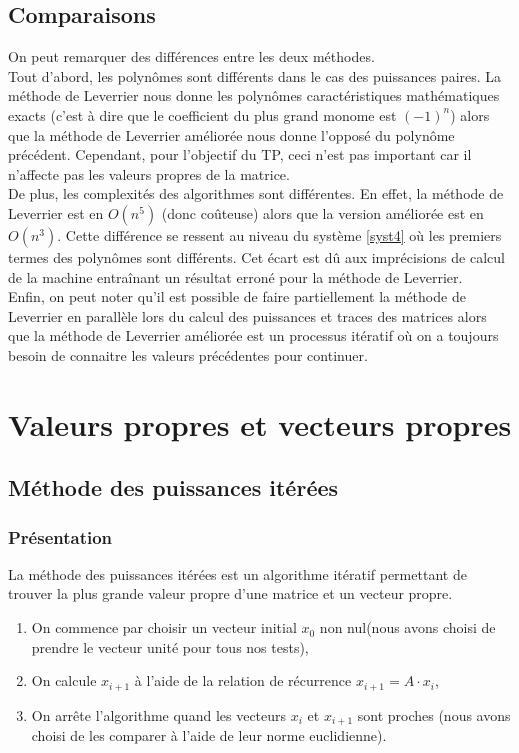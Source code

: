 \documentclass{report}
\begin{document}
    \section{Comparaisons}
    On peut remarquer des différences entre les deux méthodes. \\
    
    Tout d'abord, les polynômes sont différents dans le cas des puissances paires. La méthode de Leverrier nous donne les polynômes caractéristiques mathématiques exacts (c'est à dire que le coefficient du plus grand monome est $(-1)^{n}$) alors que la méthode de Leverrier améliorée nous donne l'opposé du polynôme précédent. Cependant, pour l'objectif du TP, ceci n'est pas important car il n'affecte pas les valeurs propres de la matrice. \\
    
    De plus, les complexités des algorithmes sont différentes. En effet, la méthode de Leverrier est en $O(n^5)$ (donc coûteuse) alors que la version améliorée est en $O(n^3)$. Cette différence se ressent au niveau du système \eqref{syst4} où les premiers termes des polynômes sont différents. Cet écart est dû aux imprécisions de calcul de la machine entraînant un résultat erroné pour la méthode de Leverrier. \\
    
    Enfin, on peut noter qu'il est possible de faire partiellement la méthode de Leverrier en parallèle lors du calcul des puissances et traces des matrices alors que la méthode de Leverrier améliorée est un processus itératif où on a toujours besoin de connaitre les valeurs précédentes pour continuer.
    
    \chapter{Valeurs propres et vecteurs propres}
    \section{Méthode des puissances itérées}
      \subsection{Présentation}
      La méthode des puissances itérées est un algorithme itératif permettant de trouver la plus grande valeur propre d'une matrice et un vecteur propre. \\
      
      \begin{enumerate}
      \item{On commence par choisir un vecteur initial $x_{0}$ non nul(nous avons choisi de prendre le vecteur unité pour tous nos tests),}
      \item{On calcule $x_{i+1}$ à l'aide de la relation de récurrence $x_{i+1} = A \cdot x_i$,} 
      \item{On arrête l'algorithme quand les vecteurs $x_i$ et $x_{i+1}$ sont proches (nous avons choisi de les comparer à l'aide de leur norme euclidienne).}
      \end{enumerate}
      
\end{document}
